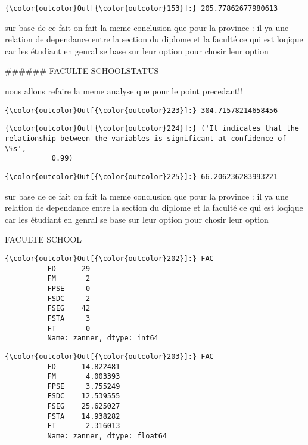 \documentclass[11pt]{article}
\begin{document}
            \begin{Verbatim}[commandchars=\\\{\}]
{\color{outcolor}Out[{\color{outcolor}153}]:} 205.77862677980613
\end{Verbatim}
        
    sur base de ce fait on fait la meme conclusion que pour la province : il
ya une relation de dependance entre la section du diplome et la faculté
ce qui est loqique car les étudiant en genral se base sur leur option
pour chosir leur option

    \#\#\#\#\#\# FACULTE SCHOOLSTATUS

    nous allons refaire la meme analyse que pour le point precedant!!

            \begin{Verbatim}[commandchars=\\\{\}]
{\color{outcolor}Out[{\color{outcolor}223}]:} 304.71578214658456
\end{Verbatim}
        
            \begin{Verbatim}[commandchars=\\\{\}]
{\color{outcolor}Out[{\color{outcolor}224}]:} ('It indicates that the relationship between the variables is significant at confidence of \%s',
           0.99)
\end{Verbatim}
        
            \begin{Verbatim}[commandchars=\\\{\}]
{\color{outcolor}Out[{\color{outcolor}225}]:} 66.206236283993221
\end{Verbatim}
        
    sur base de ce fait on fait la meme conclusion que pour la province : il
ya une relation de dependance entre la section du diplome et la faculté
ce qui est loqique car les étudiant en genral se base sur leur option
pour chosir leur option

    FACULTE SCHOOL

            \begin{Verbatim}[commandchars=\\\{\}]
{\color{outcolor}Out[{\color{outcolor}202}]:} FAC
          FD      29
          FM       2
          FPSE     0
          FSDC     2
          FSEG    42
          FSTA     3
          FT       0
          Name: zanner, dtype: int64
\end{Verbatim}
        
            \begin{Verbatim}[commandchars=\\\{\}]
{\color{outcolor}Out[{\color{outcolor}203}]:} FAC
          FD      14.822481
          FM       4.003393
          FPSE     3.755249
          FSDC    12.539555
          FSEG    25.625027
          FSTA    14.938282
          FT       2.316013
          Name: zanner, dtype: float64
\end{Verbatim}
        
\end{document}
